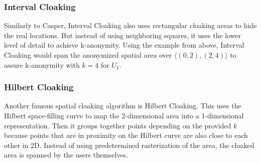 \subsubsection{Interval Cloaking}
Similarly to Casper, Interval Cloaking also uses rectangular cloaking areas to hide the real locations. But instead of using neighboring squares, it uses the lower level of detail to achieve k-anonymity. Using the example from above, Interval Cloaking would span the anonymized spatial area over \(\langle(0,2),(2,4)\rangle\) to assure k-anonymity with \(k=4\) for \(U_1\).

\subsubsection{Hilbert Cloaking}
Another famous spatial cloaking algorithm is Hilbert Cloaking. This uses the Hilbert space-filling curve to map the 2-dimensional area into a 1-dimensional representation. Then it groups together points depending on the provided \(k\) because points that are in proximity on the Hilbert curve are also close to each other in 2D. Instead of using predetermined rasterization of the area, the cloaked area is spanned by the users themselves.

